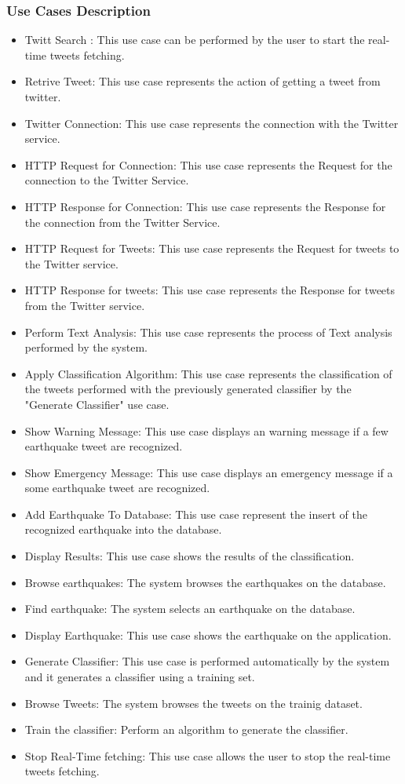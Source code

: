 \documentclass[a4paper, oneside]{article}
\begin{document}
\subsubsection{Use Cases Description}
\begin{itemize}
\item Twitt Search : This use case can be performed by the user to start the real-time tweets fetching.
\item Retrive Tweet: This use case represents the action of getting a tweet from twitter.
\item Twitter Connection: This use case represents the connection with the Twitter service.
\item HTTP Request for Connection: This use case represents the Request for the connection to the Twitter Service.
\item HTTP Response for Connection: This use case represents the Response for the connection from the Twitter Service.
\item HTTP Request for Tweets: This use case represents the Request for tweets to the Twitter service.
\item HTTP Response for tweets: This use case represents the Response for tweets from the Twitter service.
\item Perform Text Analysis: This use case represents the process of Text analysis performed by the system.
\item Apply Classification Algorithm: This use case represents the classification of the tweets performed with the previously generated classifier by the "Generate Classifier" use case.
\item Show Warning Message: This use case displays an warning message if a few earthquake tweet are recognized.
\item Show Emergency Message: This use case displays an emergency message if a some earthquake tweet are recognized.
\item Add Earthquake To Database: This use case represent the insert of the recognized earthquake into the database.
\item Display Results: This use case shows the results of the classification.
\item Browse earthquakes: The system browses the earthquakes on the database.
\item Find earthquake: The system selects an earthquake on the database.
\item Display Earthquake: This use case shows the earthquake on the application.
\item Generate Classifier: This use case is performed automatically by the system and it generates a classifier using a training set. 
\item Browse Tweets: The system browses the tweets on the trainig dataset.
\item Train the classifier: Perform an algorithm to generate the classifier.
\item Stop Real-Time fetching: This use case allows the user to stop the real-time tweets fetching.
\end{itemize}
\end{document}
